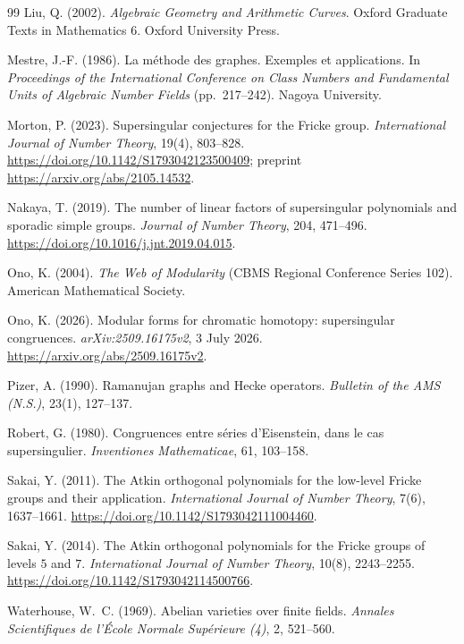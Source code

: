 \documentclass[11pt,a4paper]{article}
\numberwithin{equation}{section}
\theoremstyle{definition}
\theoremstyle{remark}
\begin{document}
\begin{thebibliography}{99}
 Liu, Q. (2002). \emph{Algebraic Geometry and Arithmetic Curves}. Oxford Graduate Texts in Mathematics 6. Oxford University Press.

 Mestre, J.-F. (1986). La m\'ethode des graphes. Exemples et applications.
In \emph{Proceedings of the International Conference on Class Numbers and Fundamental Units of Algebraic
Number Fields} (pp.~217--242). Nagoya University.

 Morton, P. (2023). Supersingular conjectures for the
Fricke group. \emph{International Journal of Number Theory}, 19(4), 803--828.
\url{https://doi.org/10.1142/S1793042123500409}; preprint
\url{https://arxiv.org/abs/2105.14532}.

 Nakaya, T. (2019). The number of linear factors of
supersingular polynomials and sporadic simple groups. \emph{Journal of Number Theory},
204, 471--496. \url{https://doi.org/10.1016/j.jnt.2019.04.015}.

 Ono, K. (2004). \emph{The Web of Modularity} (CBMS Regional Conference Series 102).
American Mathematical Society.

 Ono, K. (2026). Modular forms for chromatic homotopy: supersingular congruences. \emph{arXiv:2509.16175v2}, 3 July 2026. \url{https://arxiv.org/abs/2509.16175v2}.

 Pizer, A. (1990). Ramanujan graphs and Hecke operators. \emph{Bulletin of the
AMS (N.S.)}, 23(1), 127--137.

 Robert, G. (1980). Congruences entre s\'eries d'Eisenstein, dans le cas supersingulier. \emph{Inventiones Mathematicae}, 61, 103--158.

 Sakai, Y. (2011). The Atkin orthogonal polynomials for
the low-level Fricke groups and their application.
\emph{International Journal of Number Theory}, 7(6), 1637--1661.
\url{https://doi.org/10.1142/S1793042111004460}.

 Sakai, Y. (2014). The Atkin orthogonal polynomials for
the Fricke groups of levels $5$ and $7$.
\emph{International Journal of Number Theory}, 10(8), 2243--2255.
\url{https://doi.org/10.1142/S1793042114500766}.

 Waterhouse, W.~C. (1969). Abelian varieties over finite fields. \emph{Annales Scientifiques de l'\'Ecole Normale Sup\'erieure (4)}, 2, 521--560.
\end{thebibliography}
\end{document}
